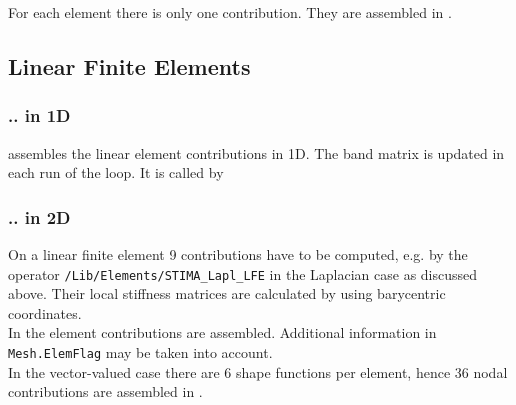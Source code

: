 For each element there is only one contribution. They are assembled in \linebreak
{}. 



\subsection{Linear Finite Elements} 

\subsubsection{.. in 1D}

  assembles the linear element contributions in 1D. The band matrix is updated in each run of the loop. It is called by \\


\subsubsection{.. in 2D}

 On a linear finite element 9 contributions have to be computed, e.g. by the operator {\tt /Lib/Elements/STIMA\_Lapl\_LFE} in the Laplacian case as discussed above. Their local stiffness matrices are calculated by using barycentric coordinates. \\

 In  the element contributions are assembled. Additional information in {\tt Mesh.ElemFlag} may be taken into account. \\


 In the vector-valued case there are 6 shape functions per element, hence 36 nodal contributions are assembled in .



